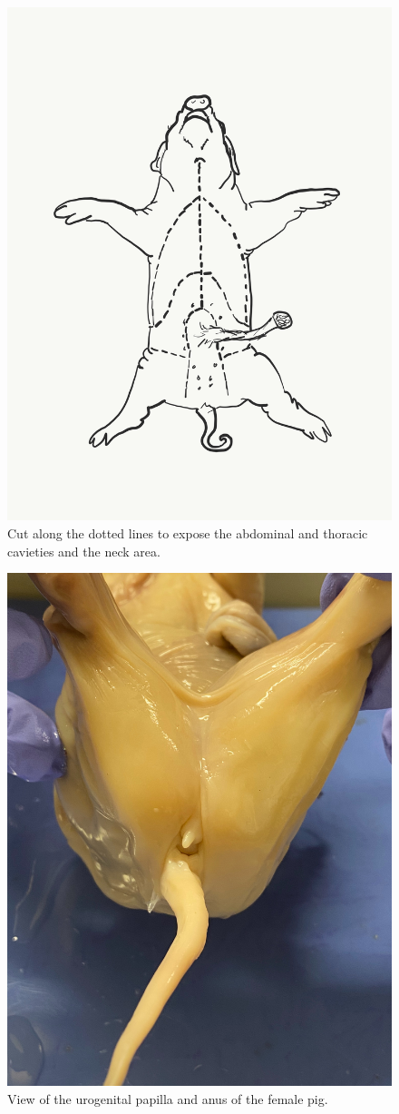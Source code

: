 \begin{figure}

{\centering \includegraphics[width=0.7\linewidth]{./figures/pig/pig_dissection} 

}

\caption{Cut along the dotted lines to expose the abdominal and thoracic cavieties and the neck area.}\label{fig:dissection}
\end{figure}

\begin{figure}

{\centering \includegraphics[width=0.7\linewidth]{./figures/pig/pig_female} 

}

\caption{View of the urogenital papilla and anus of the female pig.}\label{fig:urogenital}
\end{figure}


